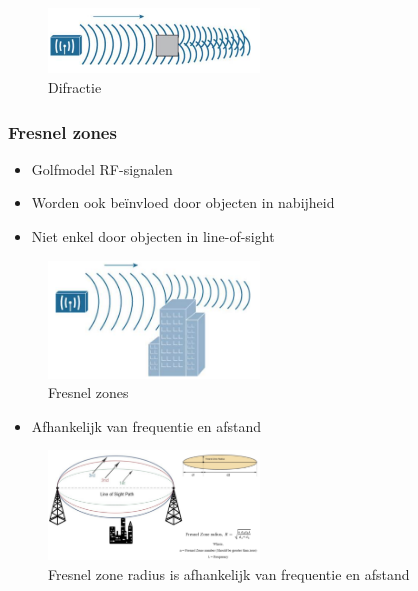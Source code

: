 \documentclass{article}
\begin{document}
\begin{figure}[H]
    \centering
    \includegraphics[width=0.5\textwidth]{Screenshot_20200309_124659.png}
    \caption{Difractie}
\end{figure}

\subsubsection{Fresnel zones}
\begin{itemize}
    \item Golfmodel RF-signalen 
    \item Worden ook beïnvloed door objecten in nabijheid
    \item Niet enkel door objecten in line-of-sight
\end{itemize}

\begin{figure}[H]
    \centering
    \includegraphics[width=0.5\textwidth]{Screenshot_20200309_124752.png}
    \caption{Fresnel zones}
\end{figure}

\begin{itemize}
    \item Afhankelijk van frequentie en afstand
\end{itemize}

\begin{figure}[H]
    \centering
    \includegraphics[width=0.5\textwidth]{Screenshot_20200309_124825.png}
    \caption{Fresnel zone radius is afhankelijk van frequentie en afstand}
\end{figure}
\end{document}
